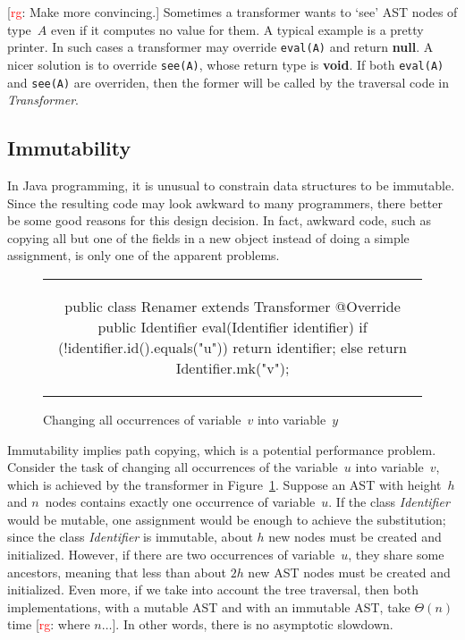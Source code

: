 \documentclass{llncs}
\newcommand{\jmlCode}{\lstinline[style=jml,basicstyle=\normalsize]}
\newcommand{\rg}[1]{{\small [\textcolor{red}{rg}: #1]}}
\newcommand{\bc}{\begin{figure}\centering\begin{tabular}{c}} %
\newcommand{\ec}[2]{\end{tabular}\caption{#1}\label{#2}\end{figure}} %
\begin{document}
\rg{Make more convincing.}
Sometimes a transformer wants to `see' AST nodes of type~$A$
even if it computes no value for them. A typical example is
a pretty printer. In such cases a transformer may override
\jmlCode|eval(A)| and return \textbf{null}. A nicer solution is
to override \jmlCode|see(A)|, whose return type is \textbf{void}.
If both \jmlCode|eval(A)| and \jmlCode|see(A)| are overriden,
then the former will be called by the traversal code in
\textit{Transformer}.

\subsection{Immutability} %
\label{sec:design.immutability}

In Java programming, it is unusual to constrain data structures
to be immutable. Since the resulting code may look awkward to
many programmers, there better be some good reasons for this
design decision. In fact, awkward code, such as copying all but
one of the fields in a new object instead of doing a simple
assignment, is only one of the apparent problems.

\bc
\begin{jml}
public class Renamer extends Transformer {
  @Override public Identifier eval(Identifier identifier) {
    if (!identifier.id().equals("u")) return identifier;
    else return Identifier.mk("v");
  }
}
\end{jml}
\ec{Changing all occurrences of variable~$v$ into variable~$y$}
{lst:example-transformer}

Immutability implies path copying, which is a potential performance
problem. Consider the task of changing all occurrences of the variable~$u$
into variable~$v$, which is achieved by the transformer in
Figure~\ref{lst:example-transformer}. Suppose an AST with height~$h$ and
$n$~nodes contains exactly one occurrence of variable~$u$. If the class
\textit{Identifier} would be mutable, one assignment would be enough to
achieve the substitution; since the class \textit{Identifier} is immutable,
about $h$ new nodes must be created and initialized. However, if there are
two occurrences of variable~$u$, they share some ancestors, meaning that
less than about $2h$ new AST nodes must be created and initialized. Even
more, if we take into account the tree traversal, then both
implementations, with a mutable AST and with an immutable AST, take
$\Theta(n)$ time \rg{where $n\ldots$}. In other words, there is no
asymptotic slowdown.
\end{document}
